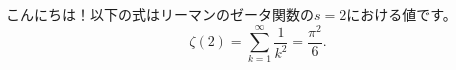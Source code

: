 \documentclass{ltjsarticle}
\begin{document}
こんにちは！以下の式はリーマンのゼータ関数の$s=2$における値です。
\[\zeta(2) = \sum_{k=1}^{\infty} \frac{1}{k^2} = \frac{\pi^2}{6}.\]
\end{document}
